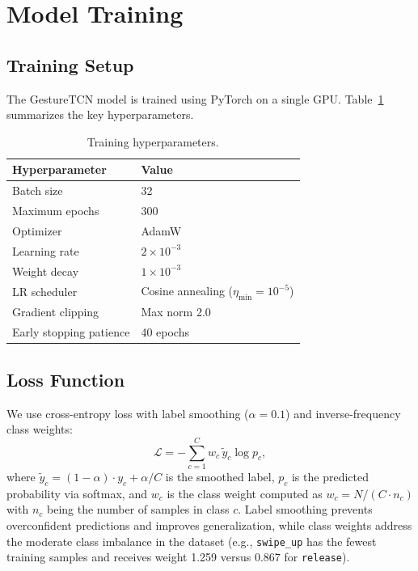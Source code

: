 \section{Model Training}
\label{sec:training}

\subsection{Training Setup}

The GestureTCN model is trained using PyTorch on a single GPU.
Table~\ref{tab:hyperparams} summarizes the key hyperparameters.

\begin{table}[ht]
\centering
\caption{Training hyperparameters.}
\label{tab:hyperparams}
\begin{tabular}{@{}ll@{}}
\toprule
\textbf{Hyperparameter} & \textbf{Value} \\
\midrule
Batch size & 32 \\
Maximum epochs & 300 \\
Optimizer & AdamW \\
Learning rate & $2 \times 10^{-3}$ \\
Weight decay & $1 \times 10^{-3}$ \\
LR scheduler & Cosine annealing ($\eta_{\min} = 10^{-5}$) \\
Gradient clipping & Max norm 2.0 \\
Early stopping patience & 40 epochs \\
\bottomrule
\end{tabular}
\end{table}

\subsection{Loss Function}

We use cross-entropy loss with label smoothing ($\alpha = 0.1$) and
inverse-frequency class weights:
\begin{equation}
  \mathcal{L} = -\sum_{c=1}^{C} w_c \, \tilde{y}_c \log p_c,
  \label{eq:loss}
\end{equation}
where $\tilde{y}_c = (1-\alpha) \cdot y_c + \alpha / C$ is the
smoothed label, $p_c$ is the predicted probability via softmax, and
$w_c$ is the class weight computed as $w_c = N / (C \cdot n_c)$ with
$n_c$ being the number of samples in class $c$. Label smoothing
prevents overconfident predictions and improves generalization, while
class weights address the moderate class imbalance in the dataset
(e.g., \texttt{swipe\_up} has the fewest training samples and
receives weight 1.259 versus 0.867 for \texttt{release}).

